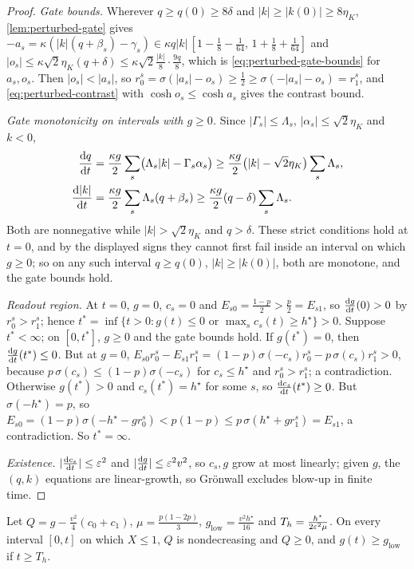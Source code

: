 \begin{proof}
\emph{Gate bounds.} Wherever $q\ge q(0)\ge8\delta$ and $|k|\ge|k(0)|\ge8\eta_K$, \cref{lem:perturbed-gate} gives
$-a_s=\kappa(|k|(q+\beta_s)-\gamma_s)\in\kappa q|k|\,[1-\frac18-\frac1{64},\,1+\frac18+\frac1{64}]$ and
$|o_s|\le\kappa\sqrt2\eta_K(q+\delta)\le\kappa\sqrt2\frac{|k|}8\cdot\frac{9q}8$, which is \cref{eq:perturbed-gate-bounds} for $a_s,o_s$. Then $|o_s|<|a_s|$,
so $r^s_0=\sigma(|a_s|-o_s)\ge\frac12\ge\sigma(-|a_s|-o_s)=r^s_1$, and \cref{eq:perturbed-contrast} with $\cosh o_s\le\cosh a_s$ gives the contrast bound.

\emph{Gate monotonicity on intervals with $g\ge0$.} Since $|\Gamma_s|\le\Lambda_s$, $|\alpha_s|\le\sqrt2\eta_K$ and $k<0$,
\[
 \begin{aligned}
 \ddt{q}&=\frac{\kappa g}{2}\sum_s\bigl(\Lambda_s|k|-\Gamma_s\alpha_s\bigr)
 \ge\frac{\kappa g}{2}\bigl(|k|-\sqrt2\eta_K\bigr)\sum_s\Lambda_s,\\
 \ddt{|k|}&=\frac{\kappa g}{2}\sum_s\Lambda_s(q+\beta_s)
 \ge\frac{\kappa g}{2}(q-\delta)\sum_s\Lambda_s.
 \end{aligned}
\]
Both are nonnegative while $|k|>\sqrt2\eta_K$ and $q>\delta$. These strict conditions hold at $t=0$, and by the displayed signs they cannot first fail
inside an interval on which $g\ge0$; so on any such interval $q\ge q(0)$, $|k|\ge|k(0)|$, both are monotone, and the gate bounds hold.

\emph{Readout region.} At $t=0$, $g=0$, $c_s=0$ and $E_{s0}=\frac{1-p}2>\frac p2=E_{s1}$, so $\ddt{g}(0)>0$ by $r^s_0>r^s_1$; hence
$t^\ast=\inf\{t>0:g(t)\le0\text{ or }\max_sc_s(t)\ge h^\star\}>0$. Suppose $t^\ast<\infty$; on $[0,t^\ast]$, $g\ge0$ and the gate bounds hold.
If $g(t^\ast)=0$, then $\ddt{g}(t^\ast)\le0$. But at $g=0$, $E_{s0}r^s_0-E_{s1}r^s_1=(1-p)\sigma(-c_s)r^s_0-p\,\sigma(c_s)r^s_1>0$, because
$p\,\sigma(c_s)\le(1-p)\sigma(-c_s)$ for $c_s\le h^\star$ and $r^s_0>r^s_1$; a contradiction. Otherwise $g(t^\ast)>0$ and $c_s(t^\ast)=h^\star$ for some
$s$, so $\ddt{c_s}(t^\ast)\ge0$. But $\sigma(-h^\star)=p$, so $E_{s0}=(1-p)\sigma(-h^\star-gr^s_0)<p(1-p)\le p\,\sigma(h^\star+gr^s_1)=E_{s1}$, a contradiction.
So $t^\ast=\infty$.

\emph{Existence.} $|\ddt{c_s}|\le\initscale^2$ and $|\ddt{g}|\le\initscale^2v^2$, so $c_s,g$ grow at most linearly; given $g$, the $(q,k)$ equations are
linear-growth, so Gr\"onwall excludes blow-up in finite time.
\end{proof}

\begin{lemma}
\label{lem:perturbed-floor}
Let $Q=g-\frac{v^2}4(c_0+c_1)$, $\mu=\frac{p(1-2p)}3$, $g_{\mathrm{low}}=\frac{v^2h^\star}{16}$ and $T_h=\frac{h^\star}{2\varepsilon^2\mu}$.
On every interval $[0,t]$ on which $X\le1$, $Q$ is nondecreasing and $Q\ge0$, and $g(t)\ge g_{\mathrm{low}}$ if $t\ge T_h$.
\end{lemma}

